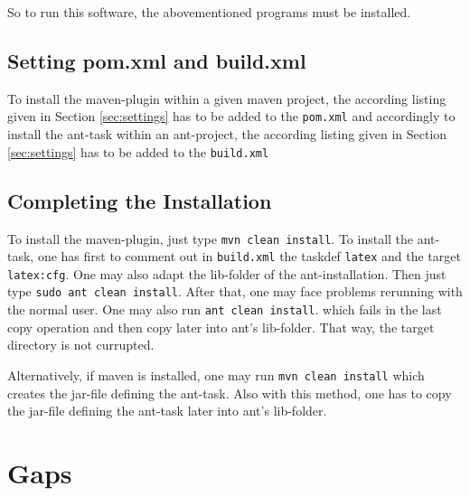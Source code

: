 \documentclass[12pt]{article}
\begin{document}
So to run this software, the abovementioned programs must be installed. 

\subsection{Setting pom.xml and build.xml}\label{subsec:sgml}

To install the maven-plugin within a given maven project, 
the according listing given in Section \ref{sec:settings} 
has to be added to the {\tt pom.xml} 
and accordingly to install the ant-task within an ant-project, 
the according listing given in Section \ref{sec:settings} 
has to be added to the {\tt build.xml} 

\subsection{Completing the Installation}\label{subsec:instComplete}

To install the maven-plugin, just type {\tt mvn clean install}. 
To install the ant-task, one has first to comment out in {\tt build.xml} 
the taskdef {\tt latex} and the target {\tt latex:cfg}. 
One may also adapt the lib-folder of the ant-installation. 
Then just type {\tt sudo ant clean install}. 
After that, one may face problems rerunning with the normal user. 
One may also run {\tt ant clean install}. 
which fails in the last copy operation 
and then copy later into ant's lib-folder. 
That way, the target directory is not currupted. 

Alternatively, if maven is installed, one may run {\tt mvn clean install} 
which creates the jar-file defining the ant-task. 
Also with this method, one has to copy the jar-file defining the ant-task 
later into ant's lib-folder. 


\section{Gaps}
\end{document}
